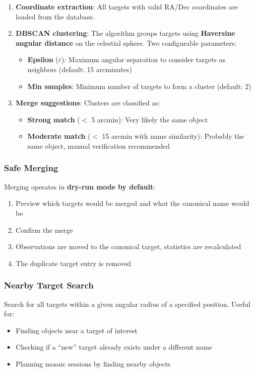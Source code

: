 \documentclass[11pt,a4paper]{article}
\begin{document}
\begin{enumerate}
    \item \textbf{Coordinate extraction}: All targets with valid RA/Dec coordinates are loaded from the database.
    \item \textbf{DBSCAN clustering}: The algorithm groups targets using \textbf{Haversine angular distance} on the celestial sphere. Two configurable parameters:
    \begin{itemize}
        \item \textbf{Epsilon} ($\varepsilon$): Maximum angular separation to consider targets as neighbors (default: 15 arcminutes)
        \item \textbf{Min samples}: Minimum number of targets to form a cluster (default: 2)
    \end{itemize}
    \item \textbf{Merge suggestions}: Clusters are classified as:
    \begin{itemize}
        \item \textbf{Strong match} ($<$ 5 arcmin): Very likely the same object
        \item \textbf{Moderate match} ($<$ 15 arcmin with name similarity): Probably the same object, manual verification recommended
    \end{itemize}
\end{enumerate}

\subsubsection{Safe Merging}

Merging operates in \textbf{dry-run mode by default}:
\begin{enumerate}
    \item Preview which targets would be merged and what the canonical name would be
    \item Confirm the merge
    \item Observations are moved to the canonical target, statistics are recalculated
    \item The duplicate target entry is removed
\end{enumerate}

\subsubsection{Nearby Target Search}

Search for all targets within a given angular radius of a specified position. Useful for:
\begin{itemize}
    \item Finding objects near a target of interest
    \item Checking if a ``new'' target already exists under a different name
    \item Planning mosaic sessions by finding nearby objects
\end{itemize}
\end{document}
